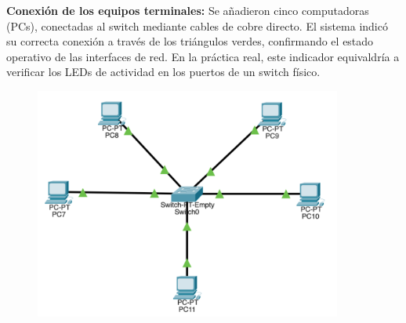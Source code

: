\documentclass[letterpaper,12pt,oneside]{article}
\begin{document}
\textbf{Conexión de los equipos terminales:}
Se añadieron cinco computadoras (PCs), conectadas al switch mediante cables de cobre directo. El sistema indicó su correcta conexión a través de los triángulos verdes, confirmando el estado operativo de las interfaces de red. En la práctica real, este indicador equivaldría a verificar los LEDs de actividad en los puertos de un switch físico.
\begin{figure}[h!]
    \centering
    \includegraphics[width=0.9\textwidth]{3.png}
\end{figure}
\end{document}
